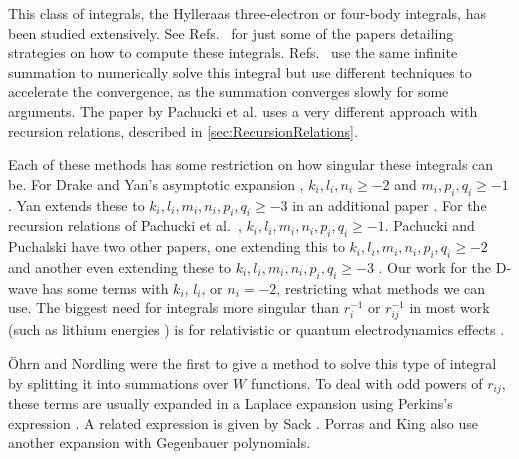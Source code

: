 \documentclass[Dissertation.tex]{subfiles}
\begin{document}
This class of integrals, the Hylleraas three-electron or four-body 
integrals, has been studied extensively. See
Refs.~\cite{Drake1995,Frolov2003,Pelzl1998,Ruiz2009,Pachucki2004} for just some of 
the papers detailing strategies on how to compute these integrals.
Refs.~\cite{Drake1995,Frolov2003,Pelzl1998} use the same infinite summation to numerically solve this 
integral but use different techniques to accelerate the convergence, as the 
summation converges slowly for some arguments. The paper by Pachucki et 
al. \cite{Pachucki2004} uses a very different approach with recursion relations,
described in \cref{sec:RecursionRelations}.

Each of these methods has some restriction on how singular these integrals 
can be. For Drake and Yan's asymptotic expansion \cite{Drake1995,Yan1997},
$k_i, l_i, n_i \geq -2$ and $m_i, p_i, q_i \geq -1$. Yan extends these to
$k_i, l_i, m_i, n_i, p_i, q_i \geq -3$ in an additional paper \cite{Yan2000a}. For 
the recursion relations of Pachucki et al.\ \cite{Pachucki2004},
$k_i, l_i, m_i, n_i, p_i, q_i \geq -1$. Pachucki and Puchalski have two other papers,
one extending this to $k_i, l_i, m_i, n_i, p_i, q_i \geq -2$ \cite{Pachucki2005} 
and another even extending these to $k_i, l_i, m_i, n_i, p_i, q_i \geq -3$ 
\cite{Pachucki2008}. Our work for the D-wave has some terms with $k_i$, $l_i$,
or $n_i = -2$, restricting what methods we can use. The biggest need for 
integrals more singular than $r_i^{-1}$ or $r_{ij}^{-1}$ in most 
work (such as lithium energies \cite{Yan1997a,Puchalski2010}) is for 
relativistic or quantum electrodynamics effects
\cite{Yan1997,Pachucki2008,Puchalski2010}.

{\"O}hrn and Nordling \cite{Ohrn1963} were the first to give a method to 
solve this type of integral by splitting it into summations over $W$ 
functions. To deal with odd powers of $r_{ij}$, these terms are usually 
expanded in a Laplace expansion using Perkins's expression \cite{Perkins1968}.
A related expression is given by Sack \cite{Sack1964}. Porras and King
\cite{Porras1994} also use another expansion with Gegenbauer polynomials.
\end{document}
